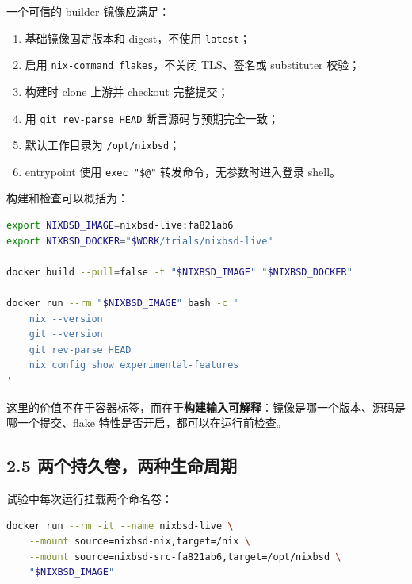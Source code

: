 \documentclass[
  11pt,
  UTF8,
  a4paper,
  fontset=fandol]{ctexart}
\newcommand{\passthrough}[1]{#1}
\providecommand{\tightlist}{%
  \setlength{\itemsep}{0pt}\setlength{\parskip}{0pt}}
\begin{document}
一个可信的 builder 镜像应满足：

\begin{enumerate}
\def\labelenumi{\arabic{enumi}.}
\tightlist
\item
  基础镜像固定版本和 digest，不使用 \passthrough{\lstinline!latest!}；
\item
  启用 \passthrough{\lstinline!nix-command flakes!}，不关闭 TLS、签名或
  substituter 校验；
\item
  构建时 clone 上游并 checkout 完整提交；
\item
  用 \passthrough{\lstinline!git rev-parse HEAD!}
  断言源码与预期完全一致；
\item
  默认工作目录为 \passthrough{\lstinline!/opt/nixbsd!}；
\item
  entrypoint 使用 \passthrough{\lstinline!exec "$@"!}
  转发命令，无参数时进入登录 shell。
\end{enumerate}

构建和检查可以概括为：

\begin{lstlisting}[language=sh]
export NIXBSD_IMAGE=nixbsd-live:fa821ab6
export NIXBSD_DOCKER="$WORK/trials/nixbsd-live"

docker build --pull=false -t "$NIXBSD_IMAGE" "$NIXBSD_DOCKER"

docker run --rm "$NIXBSD_IMAGE" bash -c '
    nix --version
    git --version
    git rev-parse HEAD
    nix config show experimental-features
'
\end{lstlisting}

这里的价值不在于容器标签，而在于\textbf{构建输入可解释}：镜像是哪一个版本、源码是哪一个提交、flake
特性是否开启，都可以在运行前检查。

\subsection{2.5
两个持久卷，两种生命周期}\label{ux4e24ux4e2aux6301ux4e45ux5377ux4e24ux79cdux751fux547dux5468ux671f}

试验中每次运行挂载两个命名卷：

\begin{lstlisting}[language=sh]
docker run --rm -it --name nixbsd-live \
    --mount source=nixbsd-nix,target=/nix \
    --mount source=nixbsd-src-fa821ab6,target=/opt/nixbsd \
    "$NIXBSD_IMAGE"
\end{lstlisting}
\end{document}
